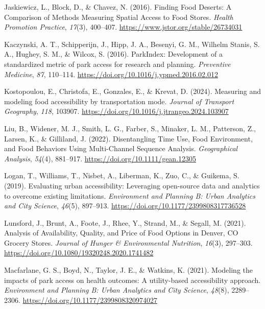 \documentclass[
  letterpaper,
  number,
  review,
  3p]{elsarticle}
\newlength{\cslhangindent}
\newenvironment{CSLReferences}[2] %
 {\begin{list}{}{%
  \setlength{\itemindent}{0pt}
  \setlength{\leftmargin}{0pt}
  \setlength{\parsep}{0pt}
  \ifodd #1
   \setlength{\leftmargin}{\cslhangindent}
   \setlength{\itemindent}{-1\cslhangindent}
  \fi
  \setlength{\itemsep}{#2\baselineskip}}}
 {\end{list}}
\begin{document}
\begin{CSLReferences}{1}{0}
Jaskiewicz, L., Block, D., \& Chavez, N. (2016). Finding {Food Deserts}:
{A Comparison} of {Methods Measuring Spatial Access} to {Food Stores}.
\emph{Health Promotion Practice}, \emph{17}(3), 400--407.
\url{https://www.jstor.org/stable/26734031}

Kaczynski, A. T., Schipperijn, J., Hipp, J. A., Besenyi, G. M., Wilhelm
Stanis, S. A., Hughey, S. M., \& Wilcox, S. (2016). {ParkIndex}:
{Development} of a standardized metric of park access for research and
planning. \emph{Preventive Medicine}, \emph{87}, 110--114.
\url{https://doi.org/10.1016/j.ypmed.2016.02.012}

Kostopoulou, E., Christofa, E., Gonzales, E., \& Krevat, D. (2024).
Measuring and modeling food accessibility by transportation mode.
\emph{Journal of Transport Geography}, \emph{118}, 103907.
\url{https://doi.org/10.1016/j.jtrangeo.2024.103907}

Liu, B., Widener, M. J., Smith, L. G., Farber, S., Minaker, L. M.,
Patterson, Z., Larsen, K., \& Gilliland, J. (2022). Disentangling {Time
Use}, {Food Environment}, and {Food Behaviors Using Multi-Channel
Sequence Analysis}. \emph{Geographical Analysis}, \emph{54}(4),
881--917. \url{https://doi.org/10.1111/gean.12305}

Logan, T., Williams, T., Nisbet, A., Liberman, K., Zuo, C., \& Guikema,
S. (2019). Evaluating urban accessibility: Leveraging open-source data
and analytics to overcome existing limitations. \emph{Environment and
Planning B: Urban Analytics and City Science}, \emph{46}(5), 897--913.
\url{https://doi.org/10.1177/2399808317736528}

Lunsford, J., Brunt, A., Foote, J., Rhee, Y., Strand, M., \& Segall, M.
(2021). Analysis of {Availability}, {Quality}, and {Price} of {Food
Options} in {Denver}, {CO Grocery Stores}. \emph{Journal of Hunger \&
Environmental Nutrition}, \emph{16}(3), 297--303.
\url{https://doi.org/10.1080/19320248.2020.1741482}

Macfarlane, G. S., Boyd, N., Taylor, J. E., \& Watkins, K. (2021).
Modeling the impacts of park access on health outcomes: A utility-based
accessibility approach. \emph{Environment and Planning B: Urban
Analytics and City Science}, \emph{48}(8), 2289--2306.
\url{https://doi.org/10.1177/2399808320974027}


\end{CSLReferences}
\end{document}
